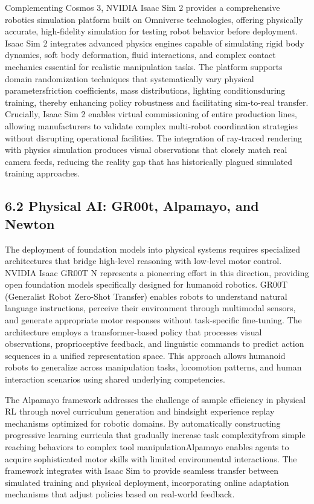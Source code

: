 Complementing Cosmos 3, NVIDIA Isaac Sim 2 provides a comprehensive robotics simulation platform built on Omniverse technologies, offering physically accurate, high-fidelity simulation for testing robot behavior before deployment. Isaac Sim 2 integrates advanced physics engines capable of simulating rigid body dynamics, soft body deformation, fluid interactions, and complex contact mechanics essential for realistic manipulation tasks. The platform supports domain randomization techniques that systematically vary physical parametersfriction coefficients, mass distributions, lighting conditionsduring training, thereby enhancing policy robustness and facilitating sim-to-real transfer. Crucially, Isaac Sim 2 enables virtual commissioning of entire production lines, allowing manufacturers to validate complex multi-robot coordination strategies without disrupting operational facilities. The integration of ray-traced rendering with physics simulation produces visual observations that closely match real camera feeds, reducing the reality gap that has historically plagued simulated training approaches.

\subsection{6.2 Physical AI: GR00t, Alpamayo, and Newton}

The deployment of foundation models into physical systems requires specialized architectures that bridge high-level reasoning with low-level motor control. NVIDIA Isaac GR00T N represents a pioneering effort in this direction, providing open foundation models specifically designed for humanoid robotics. GR00T (Generalist Robot Zero-Shot Transfer) enables robots to understand natural language instructions, perceive their environment through multimodal sensors, and generate appropriate motor responses without task-specific fine-tuning. The architecture employs a transformer-based policy that processes visual observations, proprioceptive feedback, and linguistic commands to predict action sequences in a unified representation space. This approach allows humanoid robots to generalize across manipulation tasks, locomotion patterns, and human interaction scenarios using shared underlying competencies.

The Alpamayo framework addresses the challenge of sample efficiency in physical RL through novel curriculum generation and hindsight experience replay mechanisms optimized for robotic domains. By automatically constructing progressive learning curricula that gradually increase task complexityfrom simple reaching behaviors to complex tool manipulationAlpamayo enables agents to acquire sophisticated motor skills with limited environmental interactions. The framework integrates with Isaac Sim to provide seamless transfer between simulated training and physical deployment, incorporating online adaptation mechanisms that adjust policies based on real-world feedback.

